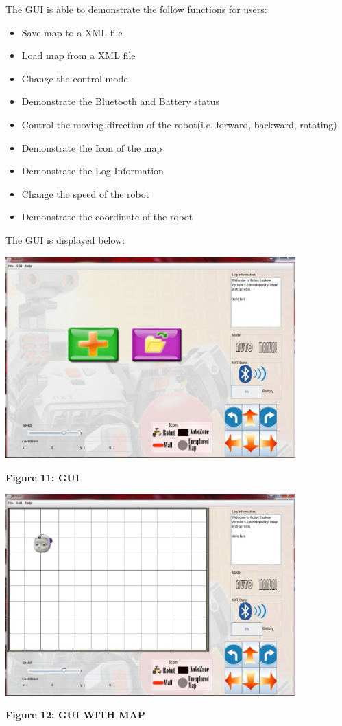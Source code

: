 \documentclass[11pt, a4paper]{report}
\begin{document}
The GUI is able to demonstrate the follow functions for users:
\begin{itemize}
\item Save map to a XML file
\item Load map from a XML file
\item Change the control mode
\item Demonstrate the Bluetooth and Battery status
\item Control the moving direction of the robot(i.e. forward, backward, rotating)
\item Demonstrate the Icon of the map
\item Demonstrate the Log Information
\item Change the speed of the robot
\item Demonstrate the coordinate of the robot
\end{itemize}
The GUI is displayed below:    
\pagebreak
\begin{center}
 \includegraphics[width=11.20cm]{GUI.jpg}
\end{center}
\begin{center}
\textbf {Figure 11: GUI} \\[0.3cm]
\end{center}
\begin{center}
 \includegraphics[width=11.20cm]{GUI2.jpg}
\end{center}
\begin{center}
\textbf {Figure 12: GUI WITH MAP} \\[0.3cm]
\end{center}
\end{document}
